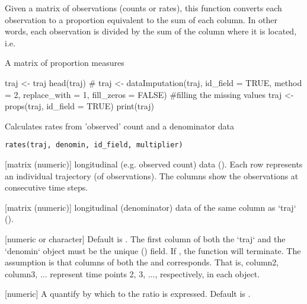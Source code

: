 \documentclass[a4paper]{book}
\begin{document}
%
\begin{Details}\relax
Given a matrix of observations (counts or rates), this function converts each observation to a proportion equivalent to the sum of each column. In other words, each observation is divided by the sum of the column where it is located, i.e. 
\end{Details}
%
\begin{Value}
A matrix of proportion measures
\end{Value}
%
\begin{Examples}
\begin{ExampleCode}
traj <- traj
head(traj) #
traj <- dataImputation(traj, id_field = TRUE, method = 2, replace_with = 1,
fill_zeros = FALSE) #filling the missing values
traj <- props(traj, id_field = TRUE)
print(traj)
\end{ExampleCode}
\end{Examples}
%
\begin{Description}\relax
Calculates rates from 'observed' count and a denominator data
\end{Description}
%
\begin{Usage}
\begin{verbatim}
rates(traj, denomin, id_field, multiplier)
\end{verbatim}
\end{Usage}
%
\begin{Arguments}
\begin{ldescription}
\item[\code{traj}] [matrix (numeric)] longitudinal (e.g. observed count) data (). Each row represents an individual trajectory (of observations). The columns show the observations at consecutive time steps.

\item[\code{denomin}] [matrix (numeric)] longitudinal (denominator) data of the same column as `traj` ().

\item[\code{id\_field}] [numeric or character] Default is . The first column of both the `traj` and the `denomin` object must be the unique () field. If , the function will terminate. The assumption is that columns of both the  and  corresponds. That is, column2, column3, ... represent time points 2, 3, ..., respectively, in each object.

\item[\code{multiplier}] [numeric] A quantify by which to the ratio  is expressed. Default is .
\end{ldescription}
\end{Arguments}
\end{document}
